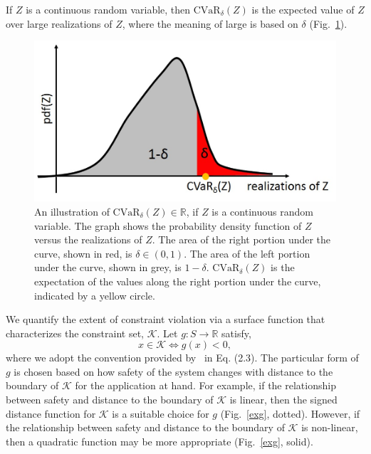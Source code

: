 \documentclass[letterpaper, 10 pt, conference]{ieeeconf}  %
\begin{document}
If $Z$ is a continuous random variable, then $\text{CVaR}_\delta(Z)$ is the expected value of $Z$ over large realizations of $Z$,
where the meaning of large is based on $\delta$ (Fig.~\ref{cvar}).

\begin{figure}[thpb]
      \centering
      \includegraphics[scale=0.5]{cvar.jpg}
      \caption{An illustration of $\text{CVaR}_\delta(Z) \in \mathbb{R}$, if $Z$ is a continuous random variable. 
	  The graph shows the probability density function of $Z$ versus the realizations of $Z$.
	  The area of the right portion under the curve, shown in red, is $\delta \in (0,1)$.	  
	  The area of the left portion under the curve, shown in grey, is $1-\delta$.
	  $\text{CVaR}_\delta(Z)$ is the expectation of the values along the right portion under the curve, indicated by a yellow circle.}
      \label{cvar}
\end{figure}

We quantify the extent of constraint violation via a surface function that characterizes the constraint set, $\mathcal{K}$.
Let $g: S \rightarrow \mathbb{R}$ satisfy,
\begin{equation}
x \in \mathcal{K} \iff g(x) < 0,
\label{g}
\end{equation}
where we adopt the convention provided by~\cite{EECS-2018-41} in Eq. (2.3). 
The particular form of $g$ is chosen based on how safety of the system changes with distance to the boundary of $\mathcal{K}$ for the application at hand.
For example, if the relationship between safety and distance to the boundary of $\mathcal{K}$ is linear, 
then the signed distance function for $\mathcal{K}$ is a suitable choice for $g$ (Fig.~\ref{exg}, dotted).
However, if the relationship between safety and distance to the boundary of $\mathcal{K}$ is non-linear,
then a quadratic function may be more appropriate (Fig.~\ref{exg}, solid).
\end{document}
